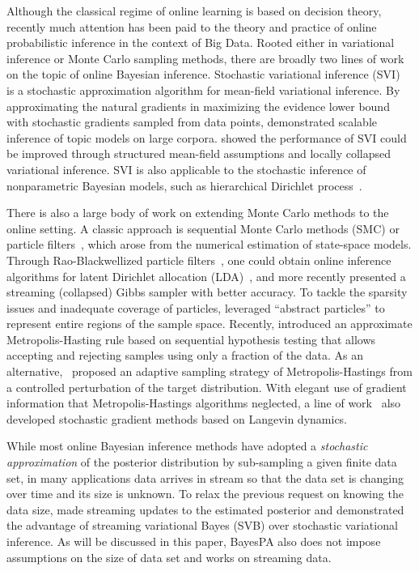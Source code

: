 \documentclass[twoside,11pt]{article}
\begin{document}
Although the classical regime of online learning is based on decision theory, recently much attention has been paid to the theory and practice of online probabilistic inference in the context of Big Data. Rooted either in variational inference or Monte Carlo sampling methods, there are broadly two lines of work on the topic of online Bayesian inference. Stochastic variational inference (SVI)~\citep{hoffman2013stochastic} is a stochastic approximation algorithm for mean-field variational inference. By approximating the natural  gradients in maximizing the evidence lower bound with stochastic gradients sampled from data points, \cite{hoffman2013stochastic} demonstrated scalable inference of topic models on large corpora. \cite{mimno2012sparse} showed the performance of SVI could be improved through structured mean-field assumptions and locally collapsed variational inference. SVI is also applicable to the stochastic inference of nonparametric Bayesian models, such as hierarchical Dirichlet process~\citep{wang2011onlinealgo, wang2012truncation}.

There is also a large body of work on extending Monte Carlo methods to the online setting. A classic approach is sequential Monte Carlo methods (SMC) or particle filters~\citep{doucet2009tutorial}, which arose from the numerical estimation of state-space models. Through Rao-Blackwellized particle filters~\citep{doucet2000rao}, one could obtain online inference algorithms for latent Dirichlet allocation (LDA)~\citep{canini2009online}, and more recently \cite{Gao:arXiv2016} presented a streaming (collapsed) Gibbs sampler with better accuracy. To tackle the sparsity issues and inadequate coverage of particles, \cite{steinhardt2014filtering} leveraged ``abstract particles'' to represent entire regions of the sample space. Recently, \cite{korattikara2014austerity} introduced an approximate Metropolis-Hasting rule based on sequential hypothesis testing that allows accepting and rejecting samples using only a fraction of the data. As an alternative,~\cite{bardenet2014towards} proposed an adaptive sampling strategy of Metropolis-Hastings from a controlled perturbation of the target distribution. With elegant use of gradient information that Metropolis-Hastings algorithms neglected, a line of work~\citep{welling2011bayesian, welling2012mc, patterson2013stochastic} also developed stochastic gradient methods based on Langevin dynamics.

While most online Bayesian inference methods have adopted a \emph{stochastic approximation} of the posterior distribution by sub-sampling a given finite data set, in many applications data arrives in stream so that the data set is changing over time and its size is unknown. To relax the previous request on knowing the data size, \cite{broderick2013streaming} made streaming updates to the estimated posterior and demonstrated the advantage of streaming variational Bayes (SVB) over stochastic variational inference. As will be discussed in this paper, BayesPA also does not impose assumptions on the size of data set and works on streaming data.
\end{document}
